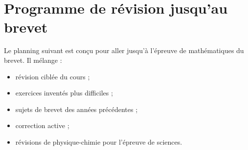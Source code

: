 \section{Programme de révision jusqu'au brevet}

\begin{objectif}
Le planning suivant est conçu pour aller jusqu'à l'épreuve de mathématiques du brevet. Il mélange :
\begin{itemize}
  \item révision ciblée du cours ;
  \item exercices inventés plus difficiles ;
  \item sujets de brevet des années précédentes ;
  \item correction active ;
  \item révisions de physique-chimie pour l'épreuve de sciences.
\end{itemize}
\end{objectif}

\renewcommand{\arraystretch}{1.35}

